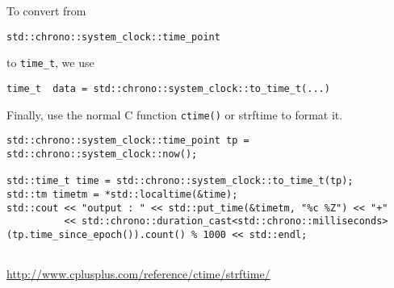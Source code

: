 To convert from
\begin{verbatim}
std::chrono::system_clock::time_point
\end{verbatim}
to \verb!time_t!, we use

\begin{lstlisting}
time_t  data = std::chrono::system_clock::to_time_t(...)
\end{lstlisting}

Finally, use the normal C function \verb!ctime()! or strftime to format it.

\begin{verbatim}
std::chrono::system_clock::time_point tp = std::chrono::system_clock::now();

std::time_t time = std::chrono::system_clock::to_time_t(tp);
std::tm timetm = *std::localtime(&time);
std::cout << "output : " << std::put_time(&timetm, "%c %Z") << "+"
          << std::chrono::duration_cast<std::chrono::milliseconds>(tp.time_since_epoch()).count() % 1000 << std::endl;
          
\end{verbatim}

\url{http://www.cplusplus.com/reference/ctime/strftime/}